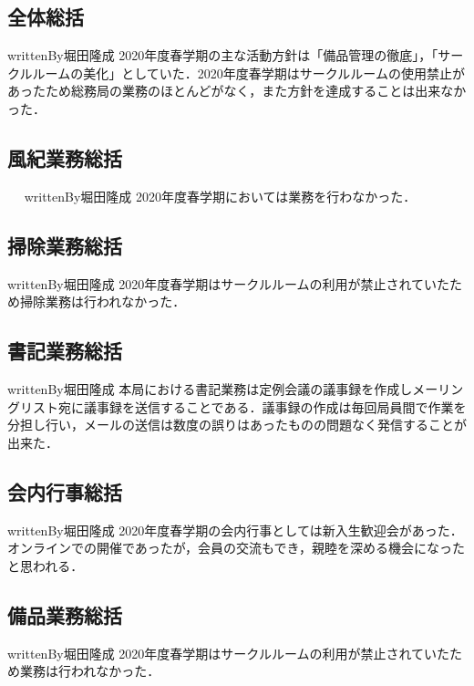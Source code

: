 \subsection*{全体総括}
writtenBy{\soumuChief}{堀田}{隆成}
2020年度春学期の主な活動方針は「備品管理の徹底」，「サークルルームの美化」としていた．2020年度春学期はサークルルームの使用禁止があったため総務局の業務のほとんどがなく，また方針を達成することは出来なかった．

\subsection*{風紀業務総括}　
writtenBy{\soumuChief}{堀田}{隆成}
2020年度春学期においては業務を行わなかった．

\subsection*{掃除業務総括}
writtenBy{\soumuChief}{堀田}{隆成}
2020年度春学期はサークルルームの利用が禁止されていたため掃除業務は行われなかった．

\subsection*{書記業務総括}
writtenBy{\soumuChief}{堀田}{隆成}
本局における書記業務は定例会議の議事録を作成しメーリングリスト宛に議事録を送信することである．議事録の作成は毎回局員間で作業を分担し行い，メールの送信は数度の誤りはあったものの問題なく発信することが出来た．

\subsection*{会内行事総括}
writtenBy{\soumuChief}{堀田}{隆成}
2020年度春学期の会内行事としては新入生歓迎会があった．オンラインでの開催であったが，会員の交流もでき，親睦を深める機会になったと思われる．

\subsection*{備品業務総括}
writtenBy{\soumuChief}{堀田}{隆成}
2020年度春学期はサークルルームの利用が禁止されていたため業務は行われなかった．


